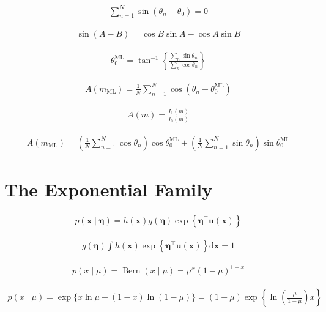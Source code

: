 \documentclass{article}
\begin{document}
\begin{align*}
\sum_{n=1}^{N} \sin (\theta_n - \theta_0) = 0
\tag{3.132}
\end{align*}

\begin{align*}
\sin(A - B) = \cos B \sin A - \cos A \sin B 
\tag{3.133}
\end{align*}

\begin{align*}
\theta_0^{\mathrm{ML}} = \tan^{-1} \left\{ \frac{\sum_n \sin \theta_n}{\sum_n \cos \theta_n} \right\} 
\tag{3.134}
\end{align*}

\begin{align*}
A(m_{\mathrm{ML}}) = \frac{1}{N} \sum_{n=1}^{N} \cos(\theta_n - \theta_0^{\mathrm{ML}}) 
\tag{3.135}
\end{align*}

\begin{align*}
A(m) = \frac{I_1(m)}{I_0(m)} 
\tag{3.136}
\end{align*}

\begin{align*}
A(m_{\mathrm{ML}}) = \left( \frac{1}{N} \sum_{n=1}^{N} \cos \theta_n \right) \cos \theta_0^{\mathrm{ML}} + \left( \frac{1}{N} \sum_{n=1}^{N} \sin \theta_n \right) \sin \theta_0^{\mathrm{ML}}
\tag{3.137}
\end{align*}

\section{The Exponential Family}

\begin{align*}
p(\mathbf{x} \mid \boldsymbol{\eta}) = h(\mathbf{x}) g(\boldsymbol{\eta}) \exp \left\{ \boldsymbol{\eta}^{\top} \mathbf{u}(\mathbf{x}) \right\} 
\tag{3.138}
\end{align*}

\begin{align*}
g(\boldsymbol{\eta}) \int h(\mathbf{x}) \exp \left\{ \boldsymbol{\eta}^{\top} \mathbf{u}(\mathbf{x}) \right\} \mathrm{d} \mathbf{x} = 1 
\tag{3.139}
\end{align*}

\begin{align*}
p(x \mid \mu) = \operatorname{Bern}(x \mid \mu) = \mu^x (1-\mu)^{1-x} 
\tag{3.140}
\end{align*}

\begin{align*}
p(x \mid \mu) = \exp \{ x \ln \mu + (1-x) \ln (1-\mu) \} = (1-\mu) \exp \left\{ \ln \left( \frac{\mu}{1-\mu} \right) x \right\} 
\tag{3.141}
\end{align*}
\end{document}
